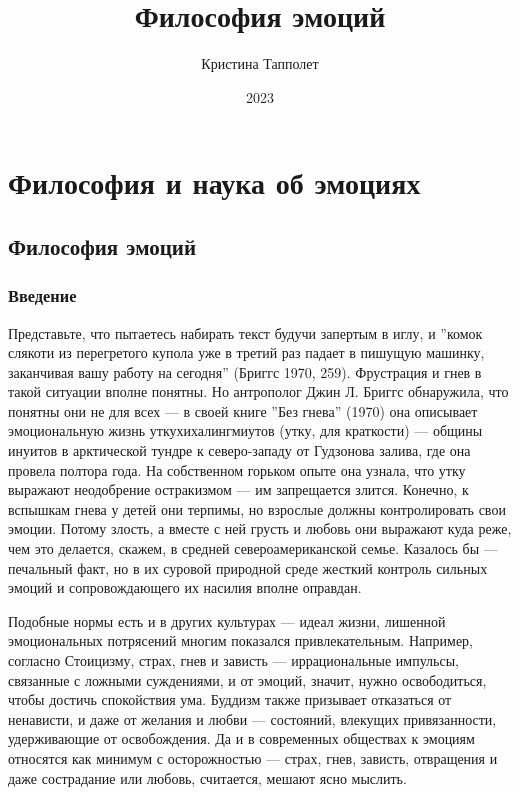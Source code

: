 \documentclass[11pt]{book}
\title{Философия эмоций}
\author{Кристина Тапполет}
\date{2023}
\begin{document}

\null
    \thispagestyle{empty}%
    \addtocounter{page}{-1}%
    \newpage

\tableofcontents

\part{Философия и наука об эмоциях}

\chapter{Философия эмоций}

\section{Введение}

Представьте, что пытаетесь набирать текст будучи запертым в иглу, и ''комок слякоти из перегретого купола уже в третий раз падает в пишущую машинку, заканчивая вашу работу на сегодня'' (Бриггс 1970, 259). Фрустрация и гнев в такой ситуации вполне понятны. Но антрополог Джин Л. Бриггс обнаружила, что понятны они не для всех --- в своей книге ''Без гнева'' (1970) она описывает эмоциональную жизнь уткухихалингмиутов (утку, для краткости) --- общины инуитов в арктической тундре к северо-западу от Гудзонова залива, где она провела полтора года. На собственном горьком опыте она узнала, что утку выражают неодобрение остракизмом --- им запрещается злится. Конечно, к вспышкам гнева у детей они терпимы, но взрослые должны контролировать свои эмоции. Потому злость, а вместе с ней грусть и любовь они выражают куда реже, чем это делается, скажем, в средней североамериканской семье. Казалось бы --- печальный факт, но в их суровой природной среде жесткий контроль сильных эмоций и сопровождающего их насилия вполне оправдан.

Подобные нормы есть и в других культурах --- идеал жизни, лишенной эмоциональных потрясений многим показался привлекательным. Например, согласно Стоицизму, страх, гнев и зависть --- иррациональные импульсы, связанные с ложными суждениями, и от эмоций, значит, нужно освободиться, чтобы достичь спокойствия ума. Буддизм также призывает отказаться от ненависти, и даже от желания и любви --- состояний, влекущих привязанности, удерживающие от освобождения. Да и в современных обществах к эмоциям относятся как минимум с осторожностью --- страх, гнев, зависть, отвращения и даже сострадание или любовь, считается, мешают ясно мыслить.
\end{document}
